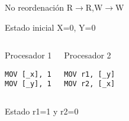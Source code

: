 \begin{frame}[t,fragile]{No reordenación R$\rightarrow$R,W$\rightarrow$W}

\begin{block}{Estado inicial}
X=0, Y=0
\end{block}


\begin{columns}[T]


\begin{block}{Procesador 1}
\begin{lstlisting}[language={[x86masm]Assembler}]
MOV [_x], 1
MOV [_y], 1
\end{lstlisting}
\end{block}

\begin{block}{Procesador 2}
\begin{lstlisting}[language={[x86masm]Assembler}]
MOV r1, [_y]
MOV r2, [_x]
\end{lstlisting}
\end{block}

\end{columns}


\begin{block}{Estado }
r1=1 y r2=0
\end{block}

\end{frame}



